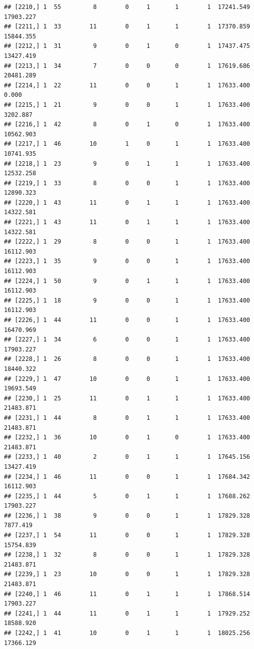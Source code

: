 \documentclass[
]{article}
\begin{document}
\begin{verbatim}
## [2210,] 1  55         8        0     1       1        1  17241.549  17903.227
## [2211,] 1  33        11        0     1       1        1  17370.859  15844.355
## [2212,] 1  31         9        0     1       0        1  17437.475  13427.419
## [2213,] 1  34         7        0     0       0        1  17619.686  20481.289
## [2214,] 1  22        11        0     0       1        1  17633.400      0.000
## [2215,] 1  21         9        0     0       1        1  17633.400   3202.887
## [2216,] 1  42         8        0     1       0        1  17633.400  10562.903
## [2217,] 1  46        10        1     0       1        1  17633.400  10741.935
## [2218,] 1  23         9        0     1       1        1  17633.400  12532.258
## [2219,] 1  33         8        0     0       1        1  17633.400  12890.323
## [2220,] 1  43        11        0     1       1        1  17633.400  14322.581
## [2221,] 1  43        11        0     1       1        1  17633.400  14322.581
## [2222,] 1  29         8        0     0       1        1  17633.400  16112.903
## [2223,] 1  35         9        0     0       1        1  17633.400  16112.903
## [2224,] 1  50         9        0     1       1        1  17633.400  16112.903
## [2225,] 1  18         9        0     0       1        1  17633.400  16112.903
## [2226,] 1  44        11        0     0       1        1  17633.400  16470.969
## [2227,] 1  34         6        0     0       1        1  17633.400  17903.227
## [2228,] 1  26         8        0     0       1        1  17633.400  18440.322
## [2229,] 1  47        10        0     0       1        1  17633.400  19693.549
## [2230,] 1  25        11        0     1       1        1  17633.400  21483.871
## [2231,] 1  44         8        0     1       1        1  17633.400  21483.871
## [2232,] 1  36        10        0     1       0        1  17633.400  21483.871
## [2233,] 1  40         2        0     1       1        1  17645.156  13427.419
## [2234,] 1  46        11        0     0       1        1  17684.342  16112.903
## [2235,] 1  44         5        0     1       1        1  17688.262  17903.227
## [2236,] 1  38         9        0     0       1        1  17829.328   7877.419
## [2237,] 1  54        11        0     0       1        1  17829.328  15754.839
## [2238,] 1  32         8        0     0       1        1  17829.328  21483.871
## [2239,] 1  23        10        0     0       1        1  17829.328  21483.871
## [2240,] 1  46        11        0     1       1        1  17868.514  17903.227
## [2241,] 1  44        11        0     1       1        1  17929.252  18588.920
## [2242,] 1  41        10        0     1       1        1  18025.256  17366.129

\end{verbatim}
\end{document}
